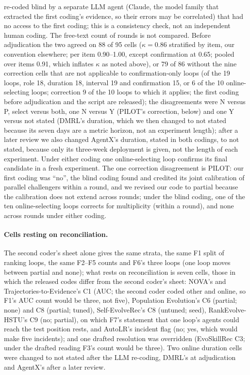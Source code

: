 \documentclass[sigconf,nonacm]{acmart}
\begin{document}
re-coded blind by a separate LLM agent (Claude, the model family that extracted the first coding's evidence, so their errors may be
correlated) that had no access to the first coding; this is a consistency check, not an
independent human coding. The free-text count of rounds is not compared. Before adjudication the two agreed on 88 of 95 cells ($\kappa = 0.86$ stratified by item, our convention elsewhere; per item 0.90--1.00, except confirmation at 0.65; pooled over items 0.91, which inflates $\kappa$ as noted above), or 79 of 86 without the nine
correction cells that are not applicable to confirmation-only loops (of the 19 loops, role 18, duration 18, interval 19
and confirmation 15, or 6 of the 10 online-selecting loops; correction 9 of the 10 loops to which it applies; the first coding before
adjudication and the script are released); the disagreements were N versus P, select versus both, one N versus Y (PILOT's correction, below) and one Y versus not stated (DMRL's
duration, which we then changed to not stated because its seven days are a metric horizon, not an experiment length); after a later
review we also changed AgentX's duration, stated in both codings, to not stated, because only its three-week deployment
is given, not the length of each experiment. Under either coding one online-selecting loop
confirms its final candidate in a fresh experiment. The one correction disagreement is PILOT: our first coding was
``no'', the blind coding found and credited its joint calibration of parallel challengers within a round, and we
revised our code to partial because the calibration does not extend across rounds; under the blind coding, one of the ten online-selecting loops corrects for multiplicity (within a round), and none across rounds under either coding.

\paragraph{Cells resting on reconciliation.} The second coder's sheet alone gives the same strata, the same F1 split of ranking loops, the same F2--F5 counts and F6's three loops (one loop moves between partial and none); what rests on reconciliation is seven cells, those in which the released codes differ from the second coder's sheet: NOVA's and Trajectories-to-Evidence's C1 (AUC; the second coder coded other and online, so F1's AUC count would be three, not five), Population Evolution's C6 (partial; none) and C8 (partial; tuned), Self-EvolveRec's C8 (untuned; seed), RankEvolve-HSTU's C9 (no; partial), on which F7's statement that one loop's agents could reach the test position rests, and AutoLR's incident flag (no; yes, which would make five incidents); and one
drafted resolution was overridden (EvoSkillRec C3; under the drafted reading F3's count would be three). Two online duration cells were changed to not stated after the LLM re-coding, DMRL's at adjudication and AgentX's after a later review.
\end{document}
